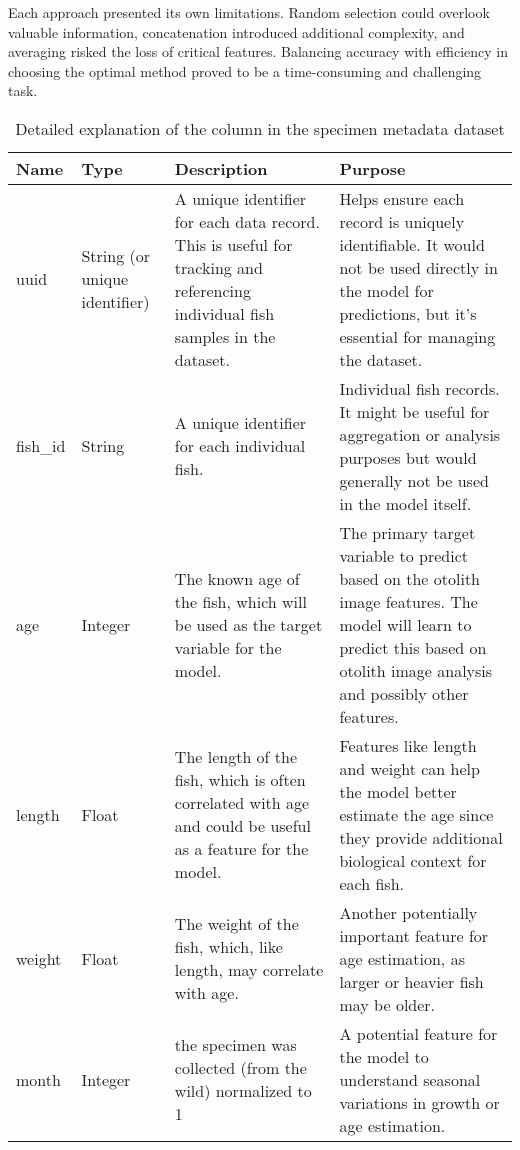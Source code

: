 Each approach presented its own limitations.
Random selection could overlook valuable information, concatenation introduced additional complexity, and averaging risked the loss of critical features.
Balancing accuracy with efficiency in choosing the optimal method proved to be a time-consuming and challenging task.



\begin{longtable}{| p{} | p{} | p{} | p{} |}
    \caption{Detailed explanation of the column in the specimen metadata dataset}
    \label{tab:features} \\
    \hline
    Name &
    Type &
    Description &
    Purpose \\
    \hline
    \hline
    uuid &
    String (or unique identifier) & A unique identifier for each data record.
    This is useful for tracking and referencing individual fish samples in the dataset. &
    Helps ensure each record is uniquely identifiable.
    It would not be used directly in the model for predictions, but it's essential for managing the dataset.  \\
    \hline
    fish\_id &
    String &
    A unique identifier for each individual fish. &
    Individual fish records.
    It might be useful for aggregation or analysis purposes but would generally not be used in the model itself. \\
    \hline
    age &
    Integer & The known age of the fish, which will be used as the target variable for the model. &
    The primary target variable to predict based on the otolith image features.
    The model will learn to predict this based on otolith image analysis and possibly other features. \\
    \hline
    length &
    Float &
    The length of the fish, which is often correlated with age and could be useful as a feature for the model. &
    Features like length and weight can help the model better estimate the age since they provide additional biological context for each fish. \\
    \hline
    weight &
    Float &
    The weight of the fish, which, like length, may correlate with age. &
    Another potentially important feature for age estimation, as larger or heavier fish may be older. \\
    \hline
    month &
    Integer &
    the specimen was collected (from the wild) normalized to 1 &
    A potential feature for the model to understand seasonal variations in growth or age estimation. \\

\end{longtable}
